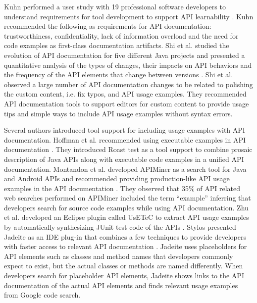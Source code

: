 \documentclass[11pt,oneside]{book}
\begin{document}
Kuhn performed a user study with 19 professional software developers to understand requirements for tool development to support API learnability \cite{Kuhn_on_designing}. Kuhn recommended the following as requirements for API documentation: trustworthiness, confidentiality, lack of information overload and the need for code examples as first-class documentation artifacts. Shi et al. studied the evolution of API documentation for five different Java projects and presented a quantitative analysis of the types of changes, their impacts on API behaviors and the frequency of the API elements that change between versions \cite{shi2011empirical}. Shi et al. observed a large number of API documentation changes to be related to polishing the custom content, i.e. fix typos, and API usage examples. They recommended API documentation tools to support editors for custom content to provide usage tips and simple ways to include API usage examples without syntax errors.

Several authors introduced tool support for including usage examples with API documentation. Hoffman et al. recommended using executable examples in API documentation \cite{Hoffman_api_documentation}. They introduced Roast test as a tool support  to combine prosaic description of Java APIs along with executable code examples in a unified API documentation. Montandon et al. developed APIMiner as a search tool for Java and Android APIs and recommended providing production-like API usage examples in the API documentation \cite{montandon2013documenting}. They observed that 35\% of API related web searches performed on APIMiner included the term “example” inferring that developers search for source code examples while using API documentation. Zhu et al. developed an Eclipse plugin called UsETeC to extract API usage examples by automatically synthesizing JUnit test code of the APIs \cite{zhu2014mining}. Stylos presented Jadeite as an IDE plug-in that combines a few techniques to provide developers with faster access to relevant API documentation \cite{Jadeite}. Jadeite uses placeholders for API elements such as classes and method names that developers commonly expect to exist, but the actual classes or methods are named differently. When developers search for placeholder API elements, Jadeite shows links to the API documentation of the actual API elements and finds relevant usage examples from Google code search.
\end{document}
